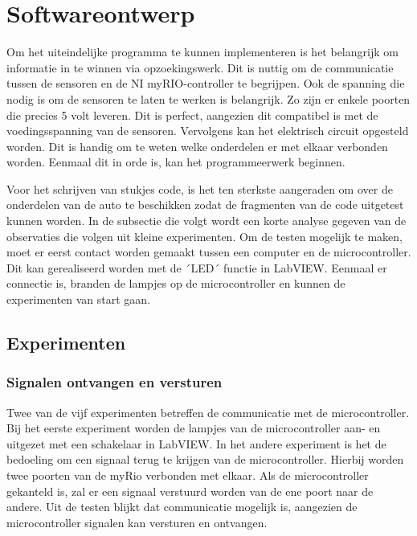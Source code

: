 \documentclass[a4paper,twoside,kulak]{kulakreport} %
\begin{document}
\section{Softwareontwerp}\label{Softwareontwerp}

Om het uiteindelijke programma te kunnen implementeren is het belangrijk om informatie in te winnen via opzoekingswerk.
Dit is nuttig om de communicatie tussen de sensoren en de NI myRIO-controller te begrijpen. Ook de spanning die nodig is om de sensoren te laten te werken is belangrijk. Zo zijn er enkele poorten die precies 5 volt leveren. Dit is perfect, aangezien dit compatibel is met de voedingsspanning van de sensoren. Vervolgens kan het elektrisch circuit opgesteld worden. Dit is handig om te weten welke onderdelen er met elkaar verbonden worden. Eenmaal dit in orde is, kan het programmeerwerk beginnen.

Voor het schrijven van stukjes code, is het ten sterkste aangeraden om over de onderdelen van de auto te beschikken zodat de fragmenten van de code uitgetest kunnen worden. In de subsectie die volgt wordt een korte analyse gegeven van de observaties die volgen uit kleine experimenten. Om de testen mogelijk te maken, moet er eerst contact worden gemaakt tussen een computer en de microcontroller. Dit kan gerealiseerd worden met de ´LED´ functie in LabVIEW. Eenmaal er connectie is, branden de lampjes op de microcontroller en kunnen de experimenten van start gaan.


\subsection{Experimenten}
\subsubsection{Signalen ontvangen en versturen}
Twee van de vijf experimenten betreffen de communicatie met de microcontroller. 
Bij het eerste experiment worden de lampjes van de microcontroller aan- en uitgezet met een schakelaar in LabVIEW.
In het andere experiment is het de bedoeling om een signaal terug te krijgen van de microcontroller.
Hierbij worden twee poorten van de myRio verbonden met elkaar. Als de microcontroller gekanteld is, zal er een signaal verstuurd worden van de ene poort naar de andere.
Uit de testen blijkt dat communicatie mogelijk is, aangezien de microcontroller signalen kan versturen en ontvangen.
\end{document}
